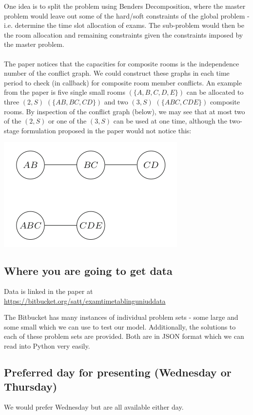 \documentclass{article}
\begin{document}
One idea is to split the problem using Benders Decomposition, where the master problem would leave out some of the hard/soft constraints of the global problem - i.e. determine the time slot allocation of exams. The sub-problem would then be the room allocation and remaining constraints given the constraints imposed by the master problem. \\
\\
\noindent The paper notices that the capacities for composite rooms is the independence number of the conflict graph. We could construct these graphs in each time period to check (in callback) for composite room member conflicts. An example from the paper is five single small rooms $(\{A, B, C, D, E\})$ can be allocated to three $(2, S)$ $(\{AB, BC, C D\})$ and two $(3, S)$ $(\{ABC, C D E\})$ composite rooms. By inspection of the conflict graph (below), we may see that at most two of the $(2, S)$ or one of the $(3, S)$ can be used at one time, although the two-stage formulation proposed in the paper would not notice this:
\begin{center}
    \includegraphics[scale=0.5]{graph.png}
\end{center}

\subsection{Where you are going to get data}

Data is linked in the paper at \url{https://bitbucket.org/satt/examtimetablinguniuddata} \medbreak

The Bitbucket has many instances of individual problem sets - some large and some small which we can use to test our model. Additionally, the solutions to each of these problem sets are provided. Both are in JSON format which we can read into Python very easily.

\bigbreak

\subsection{Preferred day for presenting (Wednesday or Thursday)}

We would prefer Wednesday but are all available either day.
\end{document}
